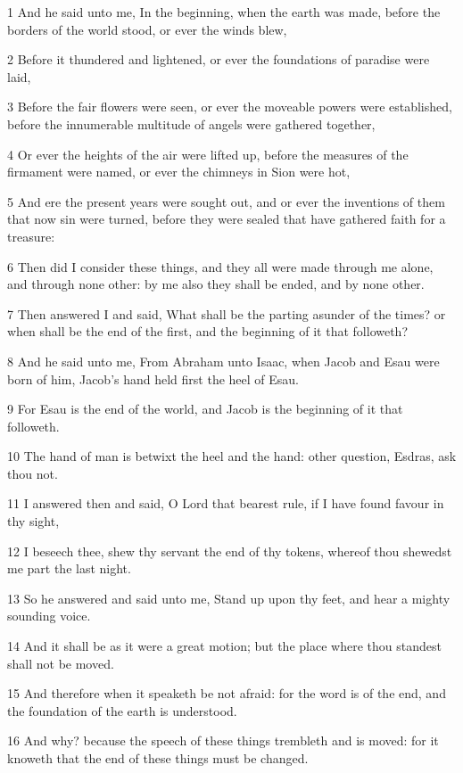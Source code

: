 \par 1 And he said unto me, In the beginning, when the earth was made, before the borders of the world stood, or ever the winds blew,
\par 2 Before it thundered and lightened, or ever the foundations of paradise were laid,
\par 3 Before the fair flowers were seen, or ever the moveable powers were established, before the innumerable multitude of angels were gathered together,
\par 4 Or ever the heights of the air were lifted up, before the measures of the firmament were named, or ever the chimneys in Sion were hot,
\par 5 And ere the present years were sought out, and or ever the inventions of them that now sin were turned, before they were sealed that have gathered faith for a treasure:
\par 6 Then did I consider these things, and they all were made through me alone, and through none other: by me also they shall be ended, and by none other.
\par 7 Then answered I and said, What shall be the parting asunder of the times? or when shall be the end of the first, and the beginning of it that followeth?
\par 8 And he said unto me, From Abraham unto Isaac, when Jacob and Esau were born of him, Jacob's hand held first the heel of Esau.
\par 9 For Esau is the end of the world, and Jacob is the beginning of it that followeth.
\par 10 The hand of man is betwixt the heel and the hand: other question, Esdras, ask thou not.
\par 11 I answered then and said, O Lord that bearest rule, if I have found favour in thy sight,
\par 12 I beseech thee, shew thy servant the end of thy tokens, whereof thou shewedst me part the last night.
\par 13 So he answered and said unto me, Stand up upon thy feet, and hear a mighty sounding voice.
\par 14 And it shall be as it were a great motion; but the place where thou standest shall not be moved.
\par 15 And therefore when it speaketh be not afraid: for the word is of the end, and the foundation of the earth is understood.
\par 16 And why? because the speech of these things trembleth and is moved: for it knoweth that the end of these things must be changed.
